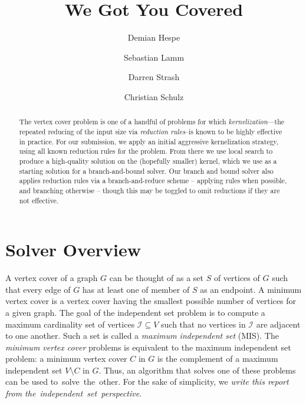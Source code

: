 \documentclass[a4paper,UKenglish]{lipics-v2016}
\newcommand{\mytitle}{We Got You Covered}
\begin{document}
\title{\mytitle}
\author[1]{Demian Hespe}
\author[2]{Sebastian Lamm}
\author[3]{Darren Strash}
\author[4]{Christian Schulz}


\date{}


\Copyright{}
\maketitle
\begin{abstract}
The vertex cover problem is one of a handful of problems for which \emph{kernelization}---the repeated reducing of the input size via \emph{reduction rules}--is known to be highly effective in practice. For our submission, we apply an initial aggressive kernelization strategy, using all known reduction rules for the problem. From there we use local search to produce a high-quality solution on the (hopefully smaller) kernel, which we use as a starting solution for a branch-and-bound solver. Our branch and bound solver also applies reduction rules via a branch-and-reduce scheme -- applying rules when possible, and branching otherwise -- though this may be toggled to omit reductions if they are not effective.\end{abstract}
\section{Solver Overview}

A vertex cover of a graph $G$ can be thought of as a set $S$ of vertices of $G$ such that every edge of $G$ has at least one of member of $S$ as an endpoint.
A minimum vertex cover is a vertex cover having the smallest possible number of vertices for a given graph. 
The goal of the independent set problem is to compute a maximum cardinality set of vertices $\mathcal{I}\subseteq V$ such that no vertices in $\mathcal{I}$ are adjacent to one another. Such a set is called a \emph{maximum independent set} (MIS).
The \emph{minimum vertex cover} problems is 
equivalent to the maximum independent set problem: a
minimum vertex cover $C$ in $G$ is the complement of a maximum independent set $V\setminus C$ in $G$. Thus, an algorithm that solves one of these problems can be used to~solve~the~other.
For the sake of simplicity, we \emph{write this report from the~independent~set~perspective}. 
\end{document}
